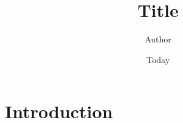 \documentclass[]{article}
\begin{document}
\title{Title}
\author{Author}
\date{Today}
\maketitle

\section{Introduction}

\cite{Babbie2010}
\cite{BachmannD.ElfrinkJ.&Vazzana1999}
\cite{Barron2002}
\cite{Bogen1996}
\cite{Bradburn1978}
\cite{Dillman2006}
\cite{Dillman1991}
\cite{DillmanDonA.SmythJoleneD.Christian2009}
\cite{Dillman1974a}
\cite{Emerson1976}
\cite{Groves2009}
\cite{Heberlein1978}
\cite{Heerwegh2005}
\cite{Joinson2007}
\cite{Lewis1993}
\cite{Madden2003}
\cite{Madden2008}
\cite{Mavis1998}
\cite{InternetWorldStats2012}
\cite{Norman2000}
\cite{Paolo2009}
\cite{Purcell2011}
\cite{Schaefer1998}
\cite{Scott1969}
\cite{Sheehan2006}
\cite{Sproull1986}
\cite{Sue2011}
\cite{Zikmund2007}



\end{document}
